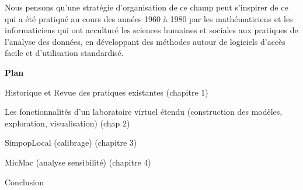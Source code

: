 Nous pensons qu’une stratégie d’organisation de ce champ peut s’inspirer  de ce qui a été pratiqué au cours des années 1960 à 1980 par les mathématiciens et les informaticiens qui ont acculturé les sciences humaines et sociales aux pratiques de l'analyse des données, en développant des méthodes autour de logiciels d'accès facile et d'utilisation standardisé.


\textbf{Plan}

Historique et Revue des pratiques existantes (chapitre 1)

Les fonctionnalités d’un laboratoire virtuel étendu (construction des modèles, exploration, visualisation) (chap 2)

SimpopLocal (calibrage) (chapitre 3)

MicMac (analyse sensibilité) (chapitre 4)

Conclusion



\printbibliography[heading=subbibliography]

\stopcontents[chapters]
